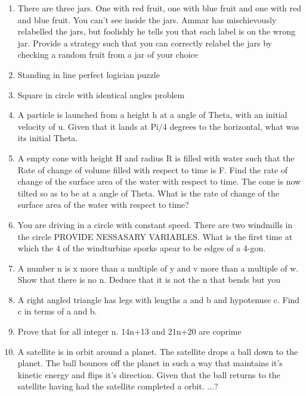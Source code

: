 \documentclass[a4paper]{article}
\begin{document}
\begin{enumerate}
\item
There are three jars. One with red fruit, one with blue fruit and one with red and blue fruit. You can’t see inside the jars. Ammar has mischievously relabelled the jars, but foolishly he tells you that each label is on the wrong jar. Provide a strategy such that you can correctly relabel the jars by checking a random fruit from a jar of your choice

\item
Standing in line perfect logician puzzle

\item
Square in circle with identical angles problem

\item
A particle is launched from a height h at a angle of Theta, with an initial velocity of u. Given that it lands at Pi/4 degrees to the horizontal, what was its initial Theta.

\item
A empty cone with height H and radius R is filled with water such that the
 Rate of change of volume filled with respect to time is F. Find the rate of change of the surface area of the water with respect to time. The cone is now tilted so as to be at a angle of Theta. What is the rate of change of the surface area of the water with respect to time?

\item
You are driving in a circle with constant speed. There are two windmills in the circle PROVIDE NESSASARY VARIABLES. What is the first time at which the 4 of the windturbine sporks apear to be edges of a 4-gon.

\item
A number n is x more than a multiple of y and v more than a multiple of w. Show that there is no n. Deduce that it is not the n that bends but you

\item
A right angled triangle has legs with lengths a and b and hypotenuse c. Find c in terms of a and b.

\item
Prove that for all integer n. 14n+13 and 21n+20 are coprime

\item
A satellite is in orbit around a planet. The satellite drops a ball down to the planet. The ball bounces off the planet in such a way that maintains it’s kinetic energy and flips it’s direction. Given that the ball returns to the satellite having had the satellite completed a orbit. ...?


\end{enumerate}
\end{document}
